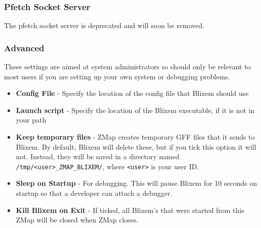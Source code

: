 \documentclass[letterpaper]{article}
\begin{document}
\subsubsection{Pfetch Socket Server}
The pfetch socket server is deprecated and will soon be removed.

\subsubsection{Advanced}
These settings are aimed at system administrators so should only be relevant to most users if you are setting up your own system or debugging problems. 

\begin{itemize}
\item \textbf{Config File} - Specify the location of the config file that Blixem should use
\item \textbf{Launch script} - Specify the location of the Blixem executable, if it is not in your path
\item \textbf{Keep temporary files} - ZMap creates temporary GFF files that it sends to Blixem. By default, Blixem will delete these, but if you tick this option it will not. Instead, they will be saved in a directory named \lstinline{/tmp/<user>_ZMAP_BLIXEM/}, where \lstinline{<user>} is your user ID.
\item \textbf{Sleep on Startup} - For debugging. This will pause Blixem for 10 seconds on startup so that a developer can attach a debugger.
\item \textbf{Kill Blixem on Exit} - If ticked, all Blixem's that were started from this ZMap will be closed when ZMap closes.
\end{itemize}


\clearpage
\end{document}
